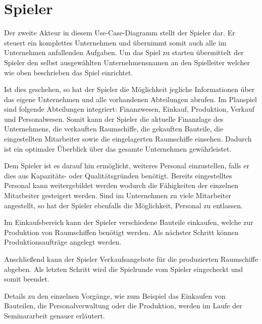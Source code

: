 \section{Spieler}
\label{sec:fachkonzept-spieler}

Der zweite Akteur in diesem Use-Case-Diagramm stellt der Spieler dar. Er steuert ein komplettes Unternehmen und übernimmt somit auch alle im Unternehmen anfallenden Aufgaben.
Um das Spiel zu starten übermittelt der Spieler den selbst ausgewählten Unternehmensnamen an den Spielleiter welcher wie oben beschrieben das Spiel einrichtet.

Ist dies geschehen, so hat der Spieler die Möglichkeit jegliche Informationen über das eigene Unternehmen und alle vorhandenen Abteilungen abrufen. Im Planspiel sind folgende Abteilungen integriert: Finanzwesen, Einkauf, Produktion, Verkauf und Personalwesen. Somit kann der Spieler die aktuelle Finanzlage des Unternehmens, die verkauften Raumschiffe, die gekauften Bauteile, die eingestellten Mitarbeiter sowie die eingelagerten Raumschiffe einsehen. Dadurch ist ein optimaler Überblick über das gesamte Unternehmen gewährleistet.

Dem Spieler ist es darauf hin ermöglicht, weiteres Personal einzustellen, falls er dies aus Kapazitäts- oder Qualitätsgründen benötigt. Bereits eingestelltes Personal kann weitergebildet werden wodurch die Fähigkeiten der einzelnen Mitarbeiter gesteigert werden. Sind im Unternehmen zu viele Mitarbeiter angestellt, so hat der Spieler ebenfalls die Möglichkeit, Personal zu entlassen.

Im Einkaufsbereich kann der Spieler verschiedene Bauteile einkaufen, welche zur Produktion von Raumschiffen benötigt werden. Als nächster Schritt können Produktionsaufträge angelegt werden. 

Anschließend kann der Spieler Verkaufsangebote für die produzierten Raumschiffe abgeben. Als letzten Schritt wird die Spielrunde vom Spieler eingecheckt und somit beendet. 

Details zu den einzelnen Vorgänge, wie zum Beispiel das Einkaufen von Bauteilen, die Personalverwaltung oder die Produktion, werden im Laufe der Seminararbeit genauer erläutert.